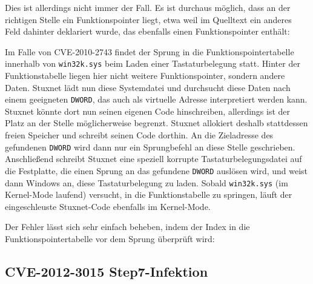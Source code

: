 \documentclass[a4paper]{article}
\begin{document}
\begin{figure}[H]
  
\end{figure}

Dies ist allerdings nicht immer der Fall.
Es ist durchaus möglich, dass an der richtigen Stelle ein Funktionspointer liegt,
etwa weil im Quelltext ein anderes Feld dahinter deklariert wurde, das ebenfalls einen Funktionspointer enthält:

\begin{figure}[H]
  
\end{figure}

Im Falle von CVE-2010-2743 findet der Sprung in die Funktionspointertabelle innerhalb von \texttt{win32k.sys} beim Laden einer Tastaturbelegung statt.
Hinter der Funktionstabelle liegen hier nicht weitere Funktionspointer, sondern andere Daten.
Stuxnet lädt nun diese Systemdatei und durchsucht diese Daten nach einem geeigneten \texttt{DWORD}, das auch als virtuelle Adresse interpretiert werden kann.
Stuxnet könnte dort nun seinen eigenen Code hinschreiben, allerdings ist der Platz an der Stelle möglicherweise begrenzt.
Stuxnet allokiert deshalb stattdessen freien Speicher und schreibt seinen Code dorthin.
An die Zieladresse des gefundenen \texttt{DWORD} wird dann nur ein Sprungbefehl an diese Stelle geschrieben.
Anschließend schreibt Stuxnet eine speziell korrupte Tastaturbelegungsdatei auf die Festplatte, die einen Sprung an das gefundene \texttt{DWORD} auslösen wird,
und weist dann Windows an, diese Tastaturbelegung zu laden.
Sobald \texttt{win32k.sys} (im Kernel-Mode laufend) versucht, in die Funktionstabelle zu springen,
läuft der eingeschleuste Stuxnet-Code ebenfalls im Kernel-Mode.

Der Fehler lässt sich sehr einfach beheben, indem der Index in die Funktionspointertabelle vor dem Sprung überprüft wird:

\begin{figure}[H]
  
\end{figure}

\subsection{CVE-2012-3015 Step7-Infektion}
\end{document}
